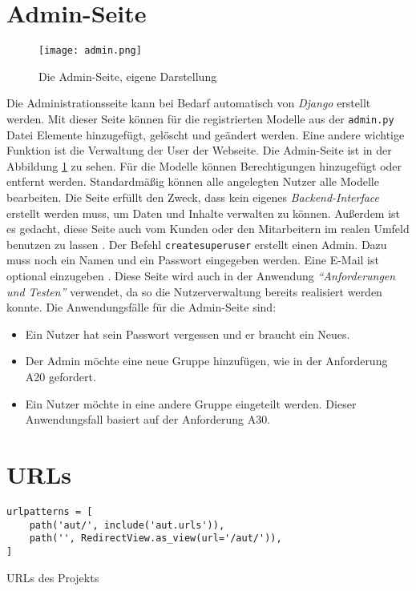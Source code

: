 \documentclass[11pt,a4paper]{report}
\begin{document}
\section{Admin-Seite}


\begin{figure}[htpb]
  \centering
  \texttt{[image: admin.png]}
  \caption{Die Admin-Seite, eigene Darstellung}
  \label{f:admin}
\end{figure}

Die Administrationsseite kann bei Bedarf automatisch von \textit{Django} erstellt werden. Mit dieser Seite können für die registrierten Modelle aus der \verb|admin.py| Datei Elemente hinzugefügt, gelöscht und geändert werden. Eine andere wichtige Funktion ist die Verwaltung der User der Webseite. Die Admin-Seite ist in der Abbildung \ref{f:admin} zu sehen. Für die Modelle können Berechtigungen hinzugefügt oder entfernt werden. Standardmäßig können alle angelegten Nutzer alle Modelle bearbeiten. Die Seite erfüllt den Zweck, dass kein eigenes \textit{Backend-Interface} erstellt werden muss, um Daten und Inhalte verwalten zu können. Außerdem ist es gedacht, diese Seite auch vom Kunden oder den Mitarbeitern im realen Umfeld benutzen zu lassen \cite{djangotuto4}. Der Befehl \verb|createsuperuser| erstellt einen Admin. Dazu muss noch ein Namen und ein Passwort eingegeben werden. Eine E-Mail ist optional einzugeben \cite{mozillatuto6}. Diese Seite wird auch in der Anwendung \textit{"`Anforderungen und Testen"'} verwendet, da so die Nutzerverwaltung bereits realisiert werden konnte. Die Anwendungsfälle für die Admin-Seite sind:
\begin{itemize}
\item Ein Nutzer hat sein Passwort vergessen und er braucht ein Neues.
\item Der Admin möchte eine neue Gruppe hinzufügen, wie in der Anforderung A20 gefordert.

\item Ein Nutzer möchte in eine andere Gruppe eingeteilt werden. Dieser Anwendungsfall basiert auf der Anforderung A30.

\end{itemize}





\section{URLs}
\label{s:iurl}

\begin{listing}[htbp]
\begin{lstlisting}
urlpatterns = [
    path('aut/', include('aut.urls')),
    path('', RedirectView.as_view(url='/aut/')),
]
\end{lstlisting}
\caption{URLs des Projekts}
\label{code:url1}
\end{listing}
\end{document}
